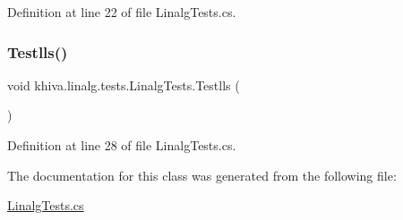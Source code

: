 Definition at line 22 of file Linalg\+Tests.\+cs.

\mbox{\label{classkhiva_1_1linalg_1_1tests_1_1_linalg_tests_a752038ecb5c51c7fca14684fa3e769e6}} 
\subsubsection{\texorpdfstring{Testlls()}{Testlls()}}
{\footnotesize\ttfamily void khiva.\+linalg.\+tests.\+Linalg\+Tests.\+Testlls (\begin{DoxyParamCaption}{ }\end{DoxyParamCaption})\hspace{0.3cm}{\ttfamily [inline]}}



Definition at line 28 of file Linalg\+Tests.\+cs.



The documentation for this class was generated from the following file\+:\begin{DoxyCompactItemize}
\item 
\mbox{\hyperlink{_linalg_tests_8cs}{Linalg\+Tests.\+cs}}\end{DoxyCompactItemize}
